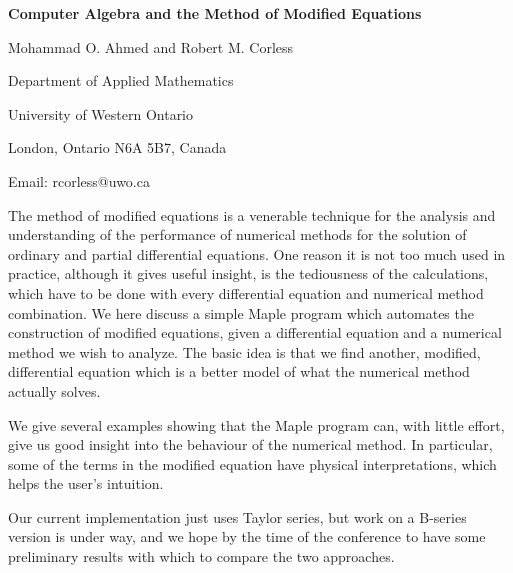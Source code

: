 

\centerline{\bf Computer Algebra and the Method of Modified Equations}

\vskip 0.3cm

\centerline{Mohammad O. Ahmed and Robert M. Corless}
\centerline{Department of Applied Mathematics}
\centerline{University of Western Ontario}
\centerline{London, Ontario N6A 5B7, Canada}
\centerline{Email: rcorless@uwo.ca}

\vskip 0.3cm

The method of modified equations is a venerable technique for the
analysis and understanding of the performance of numerical methods
for the solution of ordinary and partial differential equations.  One
reason it is not too much used in practice, although it gives useful
insight, is the tediousness of the
calculations, which have to be done with every differential equation
and numerical method combination.  We
here discuss a simple Maple program which automates the construction of
modified equations, given a differential equation and a numerical method
we wish to analyze.  The basic idea is that we find another, modified,
differential equation which is a better model of what the numerical
method actually solves.

We give several examples showing that the Maple program can, with little
effort, give us good insight into the behaviour of the numerical method.
In particular, some of the terms in the modified equation have physical
interpretations, which helps the user's intuition.

Our current implementation just uses Taylor series, but work on a
B-series version is under way, and we hope by the time of the conference
to have some preliminary results with which to compare the two
approaches.


